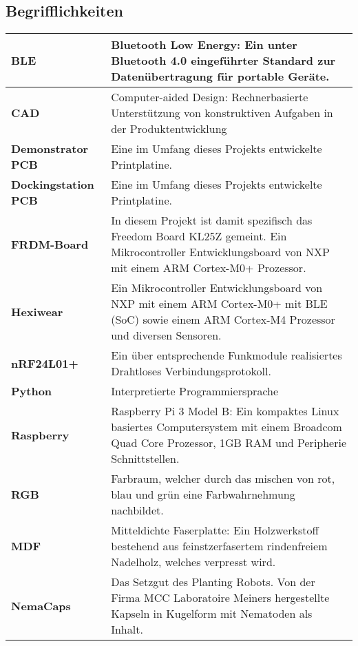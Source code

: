 \subsection*{Begrifflichkeiten}
\begin{table}[H]
	
	\begin{tabular}{|L{4.5cm}|L{11cm}|}
		\hline
		\textbf{BLE} & Bluetooth Low Energy: Ein unter Bluetooth 4.0 eingeführter Standard zur Datenübertragung für portable Geräte.\\
		
		\hline
		\textbf{CAD} & Computer-aided Design: Rechnerbasierte Unterstützung von konstruktiven Aufgaben in der Produktentwicklung \\
		
		\hline		
		\textbf{Demonstrator PCB} & Eine im Umfang dieses Projekts entwickelte Printplatine.\\
		
		\hline		
		\textbf{Dockingstation PCB} & Eine im Umfang dieses Projekts entwickelte Printplatine.\\
		
		\hline		
		\textbf{FRDM-Board} & In diesem Projekt ist damit spezifisch das Freedom Board KL25Z gemeint. Ein Mikrocontroller Entwicklungsboard von NXP mit einem ARM Cortex-M0+ Prozessor. \\
		
		\hline
		\textbf{Hexiwear} & Ein Mikrocontroller Entwicklungsboard von NXP mit einem ARM Cortex-M0+ mit BLE (SoC) sowie einem ARM Cortex-M4 Prozessor und diversen Sensoren.\\
		
		\hline
		\textbf{nRF24L01+} & Ein über entsprechende Funkmodule realisiertes Drahtloses Verbindungsprotokoll.\\	
			
		\hline
		\textbf{Python} & Interpretierte Programmiersprache \\
		
		\hline		
		\textbf{Raspberry} & Raspberry Pi 3 Model B: Ein kompaktes Linux basiertes Computersystem mit einem Broadcom Quad Core Prozessor, 1GB RAM und Peripherie Schnittstellen. \\	
		
		\hline
		\textbf{RGB} &  Farbraum, welcher durch das mischen von rot, blau und grün eine Farbwahrnehmung nachbildet. \\
		
		\hline
		\textbf{MDF} &  Mitteldichte Faserplatte: Ein Holzwerkstoff bestehend aus feinstzerfasertem rindenfreiem Nadelholz, welches verpresst wird.  \\		
		
		\hline
		\textbf{NemaCaps} &  Das Setzgut des Planting Robots. Von der Firma MCC Laboratoire Meiners hergestellte Kapseln in Kugelform mit Nematoden als Inhalt. \\
		
		\hline
	\end{tabular} 
	\vspace{0.2cm}
\end{table}


